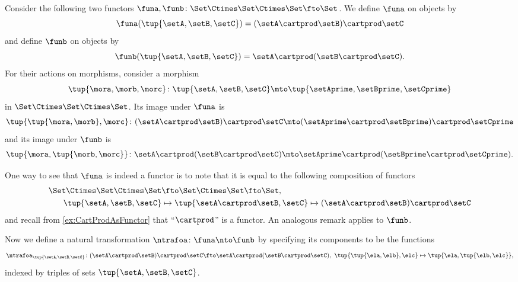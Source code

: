 \begin{example}
    Consider the following two functors $\funa, \funb \colon \Set \Ctimes \Set \Ctimes \Set \fto \Set$.
    We define $\funa$ on objects by
    \begin{equation}
        \funa(\tup{\setA, \setB, \setC}) = (\setA \cartprod \setB) \cartprod \setC
    \end{equation}
    and define $\funb$ on objects by
    \begin{equation}
        \funb(\tup{\setA, \setB, \setC}) = \setA \cartprod (\setB \cartprod \setC).
    \end{equation}
    For their actions on morphisms, consider a morphism
    \begin{equation}
        \tup{\mora, \morb, \morc} \colon \tup{\setA, \setB, \setC} \mto \tup{\setAprime, \setBprime, \setCprime}
    \end{equation}
    in $\Set \Ctimes \Set \Ctimes \Set$.
    Its image under $\funa$ is
    \begin{equation}
        \tup{\tup{\mora, \morb}, \morc} \colon (\setA \cartprod \setB) \cartprod \setC \mto (\setAprime \cartprod \setBprime) \cartprod \setCprime
    \end{equation}
    and its image under $\funb$ is
    \begin{equation}
        \tup{\mora, \tup{\morb, \morc}} \colon \setA \cartprod (\setB \cartprod \setC) \mto \setAprime \cartprod (\setBprime \cartprod \setCprime).
    \end{equation}

    One way to see that $\funa$ is indeed a functor is to note that it is equal to the following composition of functors
    \begin{equation}
        \begin{aligned}
            \Set \Ctimes \Set \Ctimes \Set & \fto \Set \Ctimes \Set \fto \Set, \\
            \tup{\setA, \setB, \setC}      & \mapsto \tup{\setA \cartprod \setB, \setC} \mapsto (\setA \cartprod \setB) \cartprod \setC
        \end{aligned}
    \end{equation}
    and recall from \cref{ex:CartProdAsFunctor} that ``$\cartprod$'' is a functor.
    An analogous remark applies to $\funb$.

    Now we define a natural transformation $\ntrafoa \colon \funa \nto \funb$ by specifying its components to be the functions
    \begin{equation}
        \ntrafoa_{\tup{\setA, \setB, \setC}} \colon (\setA \cartprod \setB) \cartprod \setC \fto \setA \cartprod (\setB \cartprod \setC), \ \tup{\tup{\ela, \elb}, \elc} \mapsto \tup{\ela, \tup{\elb, \elc}},
    \end{equation}
    indexed by triples of sets $\tup{\setA, \setB, \setC}$.


\end{example}
